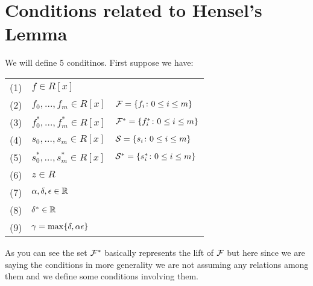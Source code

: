 \section{Conditions related to Hensel's Lemma}
We will define 5 conditinos. First suppose we have:
\begin{flushleft}
	\begin{tabular}{rll}
		(1) & $f\in R[x]$ & \\
		(2) & $f_0,\dots, f_m\in R[x]$ & $\mathcal{F}=\{f_i\colon 0\leq i\leq m\}$\\
		(3) & $f^*_0,\dots, f^*_m\in R[x]$ & $\mathcal{F}^*=\{f^*_i\colon 0\leq i\leq m\}$\\
		(4) & $s_0,\dots, s_m\in R[x]$ & $\mathcal{S}=\{s_i\colon 0\leq i\leq m\}$\\
		(5) & $s^*_0,\dots, s^*_m\in R[x]$ & $\mathcal{S}^*=\{s^*_i\colon 0\leq i\leq m\}$\\
		(6) & $z\in R$ & \\
		(7) & $\alpha,\delta,\epsilon\in \mathbb{R}$ & \\
		(8) & $\delta ^*\in \mathbb{R}$ & \\
		(9) & $\gamma=\max\{\delta,\alpha \epsilon\}$		
	\end{tabular}
\end{flushleft}
As you can see the set $\mathcal{F}^*$ basically represents the lift of $\mathcal{F}$ but here since we are saying the conditions in more generality we are not assuming any relations among them and we define some conditions involving them.
